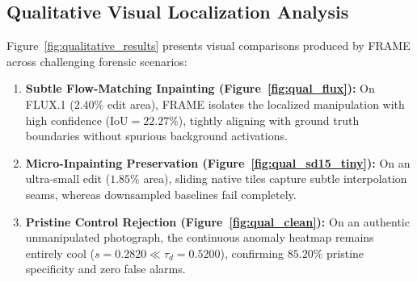 \documentclass[sigconf,review=true]{acmart}
\begin{document}
\begin{table}[t]
\centering\small
\caption{Robustness evaluation under post-processing JPEG recompression across diverse quality factors ($Q \in \{95, 75, 50\}$) on the 1,000-image multi-generator benchmark.}
\label{tab:jpeg_robustness}
\end{table}

\subsection{Qualitative Visual Localization Analysis}
Figure~\ref{fig:qualitative_results} presents visual comparisons produced by FRAME across challenging forensic scenarios:
\begin{enumerate}
    \item \textbf{Subtle Flow-Matching Inpainting (Figure~\ref{fig:qual_flux}):} On FLUX.1 ($2.40\%$ edit area), FRAME isolates the localized manipulation with high confidence ($\mathrm{IoU} = 22.27\%$), tightly aligning with ground truth boundaries without spurious background activations.
    \item \textbf{Micro-Inpainting Preservation (Figure~\ref{fig:qual_sd15_tiny}):} On an ultra-small edit ($1.85\%$ area), sliding native tiles capture subtle interpolation seams, whereas downsampled baselines fail completely.
    \item \textbf{Pristine Control Rejection (Figure~\ref{fig:qual_clean}):} On an authentic unmanipulated photograph, the continuous anomaly heatmap remains entirely cool ($s = 0.2820 \ll \tau_d = 0.5200$), confirming $85.20\%$ pristine specificity and zero false alarms.
\end{enumerate}
\end{document}
